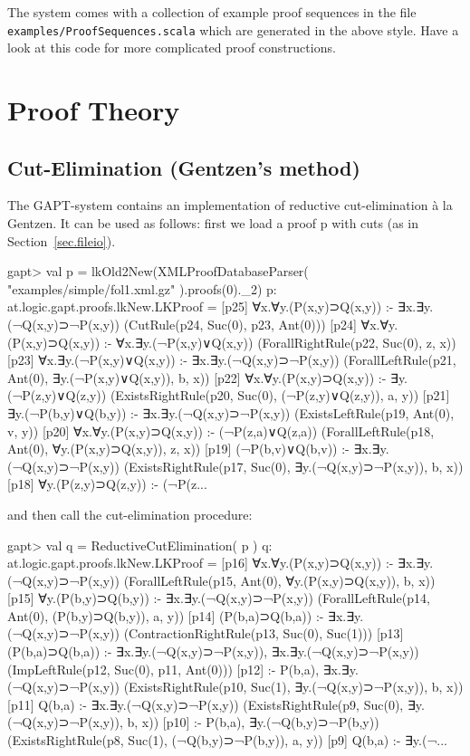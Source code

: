 \documentclass[a4paper,11pt]{article}
\newcommand{\cli}[1]{{\tt {#1}}}
\begin{document}
The system comes with a collection of example proof sequences in the file
\cli{examples/ProofSequences.scala} which are generated in the above style.
Have a look at this code for more complicated proof constructions.


\section{Proof Theory}

\subsection{Cut-Elimination (Gentzen's method)}

The GAPT-system contains an implementation of reductive cut-elimination
\`{a} la Gentzen. It can be used as follows: first we load a proof p
with cuts (as in Section~\ref{sec.fileio}).
%
\begin{clilisting}
gapt> val p = lkOld2New(XMLProofDatabaseParser( "examples/simple/fol1.xml.gz" ).proofs(0)._2)
p: at.logic.gapt.proofs.lkNew.LKProof =
[p25] ∀x.∀y.(P(x,y)⊃Q(x,y)) :- ∃x.∃y.(¬Q(x,y)⊃¬P(x,y))    (CutRule(p24, Suc(0), p23, Ant(0)))
[p24] ∀x.∀y.(P(x,y)⊃Q(x,y)) :- ∀x.∃y.(¬P(x,y)∨Q(x,y))    (ForallRightRule(p22, Suc(0), z, x))
[p23] ∀x.∃y.(¬P(x,y)∨Q(x,y)) :- ∃x.∃y.(¬Q(x,y)⊃¬P(x,y))    (ForallLeftRule(p21, Ant(0), ∃y.(¬P(x,y)∨Q(x,y)), b, x))
[p22] ∀x.∀y.(P(x,y)⊃Q(x,y)) :- ∃y.(¬P(z,y)∨Q(z,y))    (ExistsRightRule(p20, Suc(0), (¬P(z,y)∨Q(z,y)), a, y))
[p21] ∃y.(¬P(b,y)∨Q(b,y)) :- ∃x.∃y.(¬Q(x,y)⊃¬P(x,y))    (ExistsLeftRule(p19, Ant(0), v, y))
[p20] ∀x.∀y.(P(x,y)⊃Q(x,y)) :- (¬P(z,a)∨Q(z,a))    (ForallLeftRule(p18, Ant(0), ∀y.(P(x,y)⊃Q(x,y)), z, x))
[p19] (¬P(b,v)∨Q(b,v)) :- ∃x.∃y.(¬Q(x,y)⊃¬P(x,y))    (ExistsRightRule(p17, Suc(0), ∃y.(¬Q(x,y)⊃¬P(x,y)), b, x))
[p18] ∀y.(P(z,y)⊃Q(z,y)) :- (¬P(z...
\end{clilisting}
%
and then call the cut-elimination procedure:
\begin{clilisting}
gapt> val q = ReductiveCutElimination( p )
q: at.logic.gapt.proofs.lkNew.LKProof =
[p16] ∀x.∀y.(P(x,y)⊃Q(x,y)) :- ∃x.∃y.(¬Q(x,y)⊃¬P(x,y))    (ForallLeftRule(p15, Ant(0), ∀y.(P(x,y)⊃Q(x,y)), b, x))
[p15] ∀y.(P(b,y)⊃Q(b,y)) :- ∃x.∃y.(¬Q(x,y)⊃¬P(x,y))    (ForallLeftRule(p14, Ant(0), (P(b,y)⊃Q(b,y)), a, y))
[p14] (P(b,a)⊃Q(b,a)) :- ∃x.∃y.(¬Q(x,y)⊃¬P(x,y))    (ContractionRightRule(p13, Suc(0), Suc(1)))
[p13] (P(b,a)⊃Q(b,a)) :- ∃x.∃y.(¬Q(x,y)⊃¬P(x,y)), ∃x.∃y.(¬Q(x,y)⊃¬P(x,y))    (ImpLeftRule(p12, Suc(0), p11, Ant(0)))
[p12]  :- P(b,a), ∃x.∃y.(¬Q(x,y)⊃¬P(x,y))    (ExistsRightRule(p10, Suc(1), ∃y.(¬Q(x,y)⊃¬P(x,y)), b, x))
[p11] Q(b,a) :- ∃x.∃y.(¬Q(x,y)⊃¬P(x,y))    (ExistsRightRule(p9, Suc(0), ∃y.(¬Q(x,y)⊃¬P(x,y)), b, x))
[p10]  :- P(b,a), ∃y.(¬Q(b,y)⊃¬P(b,y))    (ExistsRightRule(p8, Suc(1), (¬Q(b,y)⊃¬P(b,y)), a, y))
[p9] Q(b,a) :- ∃y.(¬...
\end{clilisting}
\end{document}

